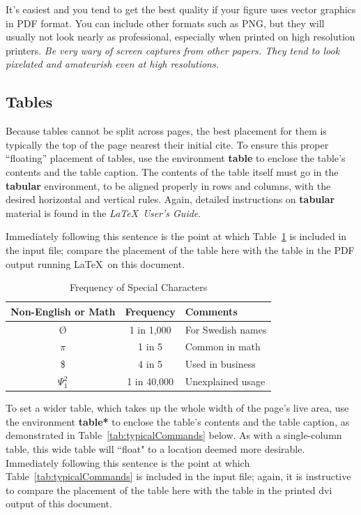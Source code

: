 \documentclass[sigplan,screen,nonacm]{acmart}
\begin{document}
It's easiest and you tend to get the best quality if your figure uses vector graphics
in PDF format. You can include other formats such as PNG, but they will usually
not look nearly as professional, especially when printed on high resolution printers.
\emph{Be very wary of screen captures from other papers. They tend to look pixelated
and amateurish even at high resolutions.}

\subsection{Tables}
\label{sec:tables}

Because tables cannot be split across pages, the best
placement for them is typically the top of the page
nearest their initial cite.  To
ensure this proper ``floating'' placement of tables, use the
environment \textbf{table} to enclose the table's contents and
the table caption.  The contents of the table itself must go
in the \textbf{tabular} environment, to
be aligned properly in rows and columns, with the desired
horizontal and vertical rules.  Again, detailed instructions
on \textbf{tabular} material
is found in the \textit{\LaTeX\ User's Guide}.

Immediately following this sentence is the point at which
Table~\ref{tab:frequencyOfSpecialChars} is included in the input file; 
compare the placement of the table here with the table in the
PDF output running \LaTeX\ on this document.

\begin{table}[t]
\centering
\caption{Frequency of Special Characters}
\label{tab:frequencyOfSpecialChars}
\begin{tabular}{c|c|l}
Non-English or Math & Frequency & Comments\\ \hline
\O & 1 in 1,000 & For Swedish names\\
$\pi$ & 1 in 5 & Common in math\\
\$ & 4 in 5 & Used in business\\
$\Psi^2_1$ & 1 in 40,000 & Unexplained usage\\
\end{tabular}
\end{table}

To set a wider table, which takes up the whole width of
the page's live area, use the environment
\textbf{table*} to enclose the table's contents and
the table caption, as demonstrated in Table~\ref{tab:typicalCommands} below.  
As with a single-column table, this wide
table will ``float" to a location deemed more desirable.
Immediately following this sentence is the point at which
Table~\ref{tab:typicalCommands} is included in the input file; again, it is
instructive to compare the placement of the
table here with the table in the printed dvi
output of this document.
\end{document}
